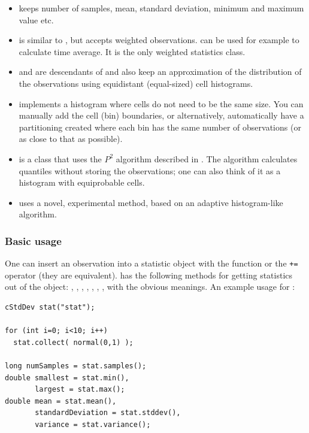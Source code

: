 \begin{itemize}
  \item{ keeps number of samples, mean, standard
    deviation, minimum and maximum value etc.}
  \item{ is similar to , but
    accepts weighted observations.  can be used
    for example to calculate time average. It is the only weighted
    statistics class.}
  \item{ and  are
    descendants of  and also keep an approximation of
    the distribution of the observations using equidistant
    (equal-sized) cell histograms.}
  \item{ implements a histogram where cells do not
    need to be the same size. You can manually add the cell (bin)
    boundaries, or alternatively, automatically have a partitioning
    created where each bin has the same number of observations (or as
    close to that as possible).}
  \item{ is a class that uses the $P^{2}$ algorithm
    described in \cite{JCh85}. The algorithm calculates quantiles without
    storing the observations; one can also think of it as a histogram
    with equiprobable cells.}
  \item{ uses a novel, experimental method, based on an
    adaptive histogram-like algorithm.}
\end{itemize}

\subsubsection{Basic usage}

One can insert an observation into a statistic object with the
 function or the \texttt{+=} operator (they are
equivalent).   has the following methods for getting
statistics out of the object: , ,
, , , ,
,  with the obvious meanings. An example
usage for :

\begin{verbatim}
cStdDev stat("stat");

for (int i=0; i<10; i++)
  stat.collect( normal(0,1) );

long numSamples = stat.samples();
double smallest = stat.min(),
       largest = stat.max();
double mean = stat.mean(),
       standardDeviation = stat.stddev(),
       variance = stat.variance();
\end{verbatim}





